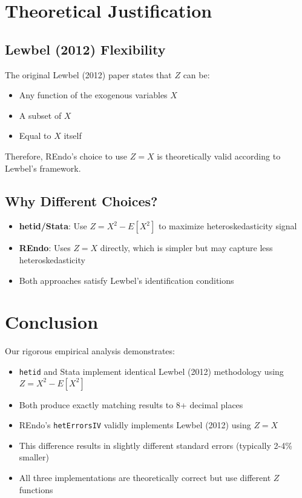 \documentclass[12pt]{article}
\begin{document}
\section{Theoretical Justification}

\subsection{Lewbel (2012) Flexibility}

The original Lewbel (2012) paper states that $Z$ can be:
\begin{itemize}
\item Any function of the exogenous variables $X$
\item A subset of $X$
\item Equal to $X$ itself
\end{itemize}

Therefore, REndo's choice to use $Z = X$ is theoretically valid according to Lewbel's framework.

\subsection{Why Different Choices?}

\begin{itemize}
\item \textbf{hetid/Stata}: Use $Z = X^2 - E[X^2]$ to maximize heteroskedasticity signal
\item \textbf{REndo}: Uses $Z = X$ directly, which is simpler but may capture less heteroskedasticity
\item Both approaches satisfy Lewbel's identification conditions
\end{itemize}

\section{Conclusion}

Our rigorous empirical analysis demonstrates:

\begin{itemize}
\item \texttt{hetid} and Stata implement identical Lewbel (2012) methodology using $Z = X^2 - E[X^2]$
\item Both produce exactly matching results to 8+ decimal places
\item REndo's \texttt{hetErrorsIV} validly implements Lewbel (2012) using $Z = X$
\item This difference results in slightly different standard errors (typically 2-4\% smaller)
\item All three implementations are theoretically correct but use different $Z$ functions
\end{itemize}
\end{document}
